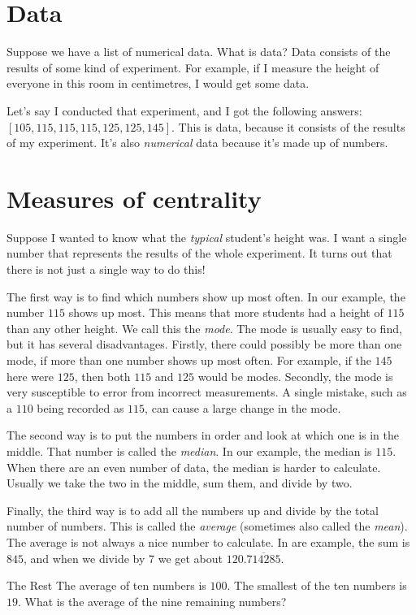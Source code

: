 \documentclass[a4paper,10pt]{report}
\begin{document}
\section{Data}

Suppose we have a list of numerical data. What is data? Data  consists of the
results of some kind of experiment. For example, if I measure the height of
everyone in this room in centimetres, I would get some data.

Let's say I conducted that experiment, and I got the following answers: $[105,
115, 115, 115, 125, 125, 145]$. This is data, because it consists of the results
of my experiment. It's also \emph{numerical} data because it's made up of
numbers.

\section{Measures of centrality}

Suppose I wanted to know what the \emph{typical} student's height was. I want a
single number that represents the results of the whole experiment. It turns out
that there is not just a single way to do this!

The first way is to find which numbers show up most often. In our example, the
number $115$ shows up most. This means that more students had a height of $115$
than any other height. We call this the \emph{mode}. The mode is usually easy to
find, but it has several disadvantages. Firstly, there could possibly be more
than one mode, if more than one number shows up most often. For example, if the
$145$ here were $125$, then both $115$ and $125$ would be modes. Secondly, the
mode is very susceptible to error from incorrect measurements. A single mistake,
such as a $110$ being recorded as $115$, can cause a large change in the mode.

The second way is to put the numbers in order and look at which one is in the
middle. That number is called the \emph{median}. In our example, the median is
$115$. When there are an even number of data, the median is harder to calculate.
Usually we take the two in the middle, sum them, and divide by two.

Finally, the third way is to add all the numbers up and divide by the total
number of numbers. This is called the \emph{average} (sometimes also called the
\emph{mean}). The average is not always a nice number to calculate. In are
example, the sum is $845$, and when we divide by $7$ we get about
$120.\overline{714285}$.

\begin{problem}{The Rest}
 The average of ten numbers is $100$. The smallest of the ten numbers is $19$.
 What is the average of the nine remaining numbers?
\end{problem}
\end{document}
